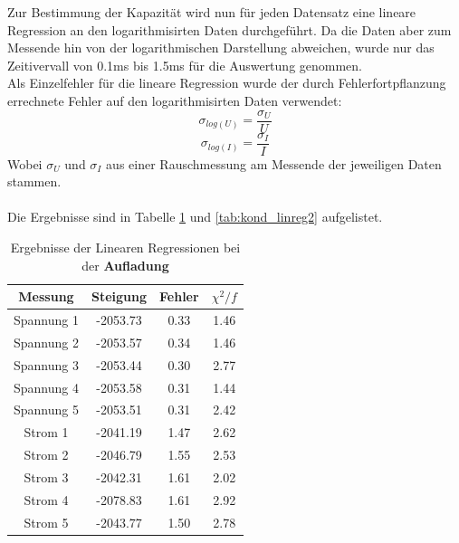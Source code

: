 \documentclass[12pt,a4paper]{article}
\begin{document}
Zur Bestimmung der Kapazität wird nun für jeden Datensatz eine lineare Regression an den logarithmisirten Daten durchgeführt. Da die Daten aber zum Messende hin von der logarithmischen Darstellung abweichen, wurde nur das Zeitivervall von 0.1ms bis 1.5ms für die Auswertung genommen.\\
Als Einzelfehler für die lineare Regression wurde der durch Fehlerfortpflanzung errechnete Fehler auf den logarithmisirten Daten verwendet:
\begin{equation}
\sigma_{log(U)} = \dfrac{\sigma_U}{U}
\end{equation}
\begin{equation}
\sigma_{log(I)} = \dfrac{\sigma_I}{I}
\end{equation}
Wobei $\sigma_U$ und $\sigma_I$ aus einer Rauschmessung am Messende der jeweiligen Daten stammen.\\
\\
Die Ergebnisse sind in Tabelle \ref{tab:kond_linreg1} und \ref{tab:kond_linreg2} aufgelistet.


\begin{table}
\begin{center}
\begin{tabular}{|c|c|c|c|}
\hline 
Messung & Steigung & Fehler & $\chi ^{2}/f$ \\ 
\hline 
Spannung 1 & -2053.73 & 0.33 & 1.46 \\ 
\hline 
Spannung 2 & -2053.57 & 0.34 & 1.46 \\ 
\hline 
Spannung 3 & -2053.44 & 0.30 & 2.77 \\ 
\hline 
Spannung 4 & -2053.58 & 0.31 & 1.44 \\ 
\hline 
Spannung 5 & -2053.51 & 0.31 & 2.42 \\ 
\hline 
\hline
Strom 1 & -2041.19 & 1.47 & 2.62 \\ 
\hline 
Strom 2 & -2046.79 & 1.55 & 2.53 \\ 
\hline 
Strom 3 & -2042.31 & 1.61 & 2.02 \\ 
\hline 
Strom 4 & -2078.83 & 1.61 & 2.92 \\ 
\hline 
Strom 5 & -2043.77 & 1.50 & 2.78 \\ 
\hline 
\end{tabular} 
\end{center}
\label{tab:kond_linreg1} 
\caption{Ergebnisse der Linearen Regressionen bei der \textbf{Aufladung}}
\end{table}
\end{document}
